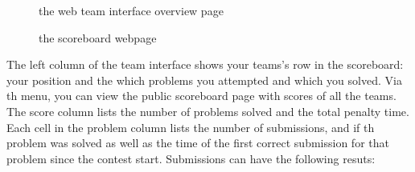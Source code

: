 \documentclass[a4paper]{article}
\begin{document}
\begin{figure}[p]
    \centering
    \caption{the web team interface overview page}
    \label{fig:team-overview}
\end{figure}

\begin{figure}[p]
    \centering
    \caption{the scoreboard webpage}
    \label{fig:team-scoreboard}
\end{figure}

The left column of the team interface shows your teams's row in the scoreboard: your position and the which problems you attempted and which you solved. Via th menu, you can view the public scoreboard page with scores of all the teams. The score column lists the number of problems solved and the total penalty time. Each cell in the problem column lists the number of submissions, and if th problem was solved as well as the time of the first correct submission for that problem since the contest start. Submissions can have the following resuts:
\end{document}

